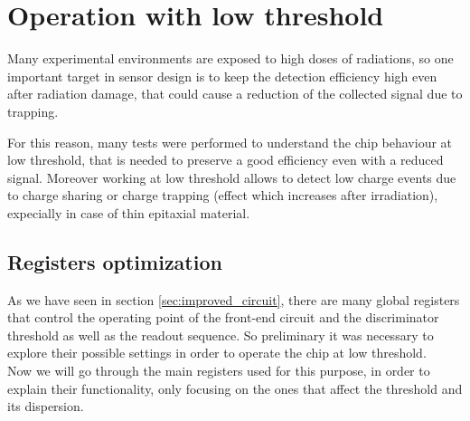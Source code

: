 \section{Operation with low threshold} \label{sec:low_thr}

Many experimental environments are exposed to high doses of radiations, so one important target in sensor design is to keep the detection efficiency high even after radiation damage, that could cause a reduction of the collected signal due to trapping. 

For this reason, many tests were performed to understand the chip behaviour at low threshold, that is needed to preserve a good efficiency even with a reduced signal. 
Moreover working at low threshold allows to detect low charge events due to charge sharing or charge trapping (effect which increases after irradiation), expecially in case of thin epitaxial material. 


\subsection{Registers optimization}

As we have seen in section \autoref{sec:improved_circuit}, there are many global registers that control the operating point of the front-end circuit and the discriminator threshold as well as the readout sequence. So preliminary it was necessary to explore their possible settings in order to operate the chip at low threshold.\\

Now we will go through the main registers used for this purpose, in order to explain their functionality, only focusing on the ones that affect the threshold and its dispersion.

